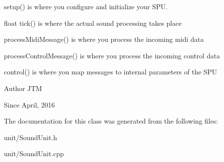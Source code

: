 \begin{DoxyItemize}
\item setup() is where you configure and initialize your S\+PU.
\item float tick() is where the actual sound processing takes place
\item process\+Midi\+Message() is where you process the incoming midi data
\item process\+Control\+Message() is where you process the incoming control data
\item control() is where you map messages to internal parameters of the S\+PU
\end{DoxyItemize}

\begin{DoxyAuthor}{Author}
J\+TM 
\end{DoxyAuthor}
\begin{DoxySince}{Since}
April, 2016 
\end{DoxySince}


The documentation for this class was generated from the following files\+:\begin{DoxyCompactItemize}
\item 
unit/Sound\+Unit.\+h\item 
unit/Sound\+Unit.\+cpp\end{DoxyCompactItemize}
